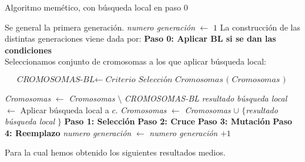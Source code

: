 \begin{algorithm}[H]
    \caption{Algoritmo memético, con búsqueda local en paso 0}
    \begin{algorithmic}[1]
        \State Se general la primera generación. 
        \State \textit{numero generación} $\gets$ $1$
        \State La construcción de las distintas generaciones viene dada por: 
        \State \textbf{Paso 0: Aplicar BL si se dan las condiciones} \\
            \State Seleccionamos conjunto de cromosomas a los que aplicar búsqueda local: 

            \begin{equation*}
                \textit{CROMOSOMAS-BL}  \gets  \textit{ Criterio Selección  Cromosomas ( Cromosomas ) }
            \end{equation*}

            \State\textit{Cromosomas } $\gets$ \textit{Cromosomas } $\setminus$ \textit{CROMOSOMAS-BL}
            \State \textit{resultado búsqueda local } $\gets$ Aplicar búsqueda local a $c$.
            \State\textit{Cromosomas } $\gets$ \textit{Cromosomas } $\cup$ $\{$\textit{resultado búsqueda local } $\}$
            \EndFor
        \EndIf 
        \State \textbf{Paso 1: Selección}
        \State \textbf{Paso 2: Cruce }
        \State \textbf{Paso 3:  Mutación}
        \State \textbf{Paso 4:  Reemplazo}
        \State \textit{numero generación} $\gets$ \textit{numero generación} $+1$
  
        \EndWhile
    \end{algorithmic}
\end{algorithm}


Para la cual hemos obtenido los siguientes resultados medios.

